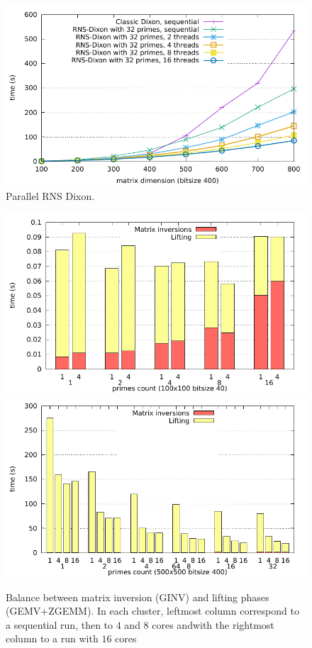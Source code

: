 \begin{figure}[htb]
\begin{center}
  \includegraphics[width=.8\textwidth]{Pictures/RNSDixon/parallel-threads}
\end{center}
\caption{Parallel RNS Dixon.}\label{fig:rnsdixon_parallel_threads}
\end{figure}

\begin{figure}[htb]
\begin{center}
  \includegraphics[width=.8\textwidth]{Pictures/RNSDixon/parallel-detailed_100n_40b}
  \includegraphics[width=.8\textwidth]{Pictures/RNSDixon/parallel-detailed_500n_400b_total}
\end{center}
\caption{Balance between matrix inversion (GINV) and lifting phases
  (GEMV+ZGEMM). In each cluster, leftmost column correspond to a
  sequential run, then to $4$ and $8$ cores andwith the rightmost
column to a run with $16$ cores}\label{fig:rnsdixon_parallel}
\end{figure}

